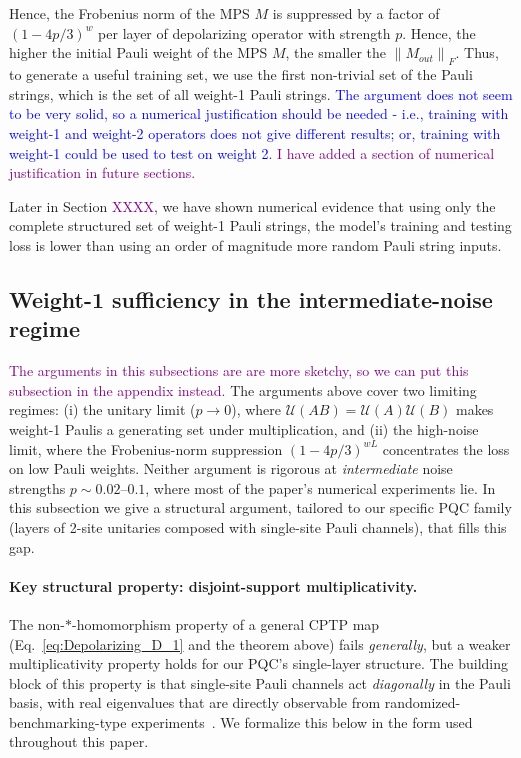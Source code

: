 \documentclass[%
 reprint,
superscriptaddress,
 amsmath,amssymb,
 aps,
]{revtex4-2}
\newcommand{\norm}[1]{\left\lVert#1\right\rVert}
\newcommand{\yijian}[1]{\textcolor{blue}{#1}}
\newcommand{\simba}[1]{\textcolor{purple}{#1}}
\begin{document}

Hence, the Frobenius norm of the MPS $M$ is suppressed by a factor of $(1-4p/3)^w$ per layer of depolarizing operator with strength $p$. Hence, the higher the initial Pauli weight of the MPS $M$, the smaller the $\norm{M_{out}}_F$. Thus, to generate a useful training set, we use the first non-trivial set of the Pauli strings, which is the set of all weight-1 Pauli strings. \yijian{The argument does not seem to be very solid, so a numerical justification should be needed - i.e., training with weight-1 and weight-2 operators does not give different results; or, training with weight-1 could be used to test on weight 2.}
\simba{I have added a section of numerical justification in future sections.}

Later in Section \simba{XXXX}, we have shown numerical evidence that using only the complete structured set of weight-1 Pauli strings, the model's training and testing loss is lower than using an order of magnitude more random Pauli string inputs.

\subsection{Weight-1 sufficiency in the intermediate-noise regime}
\label{sec:intermediate_noise_sufficiency}

\simba{The arguments in this subsections are are more sketchy, so we can put this subsection in the appendix instead.}
The arguments above cover two limiting regimes: (i) the unitary limit ($p\to 0$), where $\mathcal{U}(AB) = \mathcal{U}(A)\mathcal{U}(B)$ makes weight-1 Paulis a generating set under multiplication, and (ii) the high-noise limit, where the Frobenius-norm suppression $(1-4p/3)^{wL}$ concentrates the loss on low Pauli weights. Neither argument is rigorous at \emph{intermediate} noise strengths $p\sim 0.02$--$0.1$, where most of the paper's numerical experiments lie. In this subsection we give a structural argument, tailored to our specific PQC family (layers of 2-site unitaries composed with single-site Pauli channels), that fills this gap.

\paragraph*{Key structural property: disjoint-support multiplicativity.}
The non-$*$-homomorphism property of a general CPTP map (Eq.~\eqref{eq:Depolarizing_D_1} and the theorem above) fails \emph{generally}, but a weaker multiplicativity property holds for our PQC's single-layer structure. The building block of this property is that single-site Pauli channels act \emph{diagonally} in the Pauli basis, with real eigenvalues that are directly observable from randomized-benchmarking-type experiments~\cite{magesan2012characterizing,flammia2020pauli,harper2020efficient}. We formalize this below in the form used throughout this paper.
\end{document}
